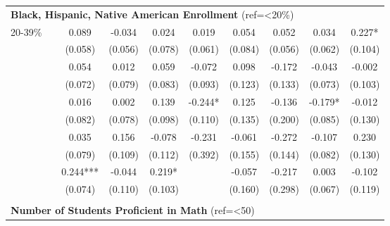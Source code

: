 \begin{tabular*}{\linewidth}{@{\extracolsep{\fill} } llcccccccc}
\multicolumn{10}{l}{\multirow{2}{1.8in}{\textbf{Black, Hispanic, Native American Enrollment} (ref=<20\%)}}\\%
&&&&&&&&&\\%
\multirow{2}{*}{\hspace{0.2cm}20{-}39\%}&&0.089&{-}0.034&0.024&0.019&0.054&0.052&0.034&0.227*\\%
&&(0.058)&(0.056)&(0.078)&(0.061)&(0.084)&(0.056)&(0.062)&(0.104)\\%
\arrayrulecolor{white}%
\hline%
\arrayrulecolor{white}%
\hline%
\arrayrulecolor{white}%
\hline%
\arrayrulecolor{white}%
\hline%
\arrayrulecolor{white}%
\hline%
\multirow{2}{*}{\hspace{0.2cm}40{-}59\%}&&0.054&0.012&0.059&{-}0.072&0.098&{-}0.172&{-}0.043&{-}0.002\\%
&&(0.072)&(0.079)&(0.083)&(0.093)&(0.123)&(0.133)&(0.073)&(0.103)\\%
\arrayrulecolor{white}%
\hline%
\arrayrulecolor{white}%
\hline%
\arrayrulecolor{white}%
\hline%
\arrayrulecolor{white}%
\hline%
\arrayrulecolor{white}%
\hline%
\multirow{2}{*}{\hspace{0.2cm}60{-}79\%}&&0.016&0.002&0.139&{-}0.244*&0.125&{-}0.136&{-}0.179*&{-}0.012\\%
&&(0.082)&(0.078)&(0.098)&(0.110)&(0.135)&(0.200)&(0.085)&(0.130)\\%
\arrayrulecolor{white}%
\hline%
\arrayrulecolor{white}%
\hline%
\arrayrulecolor{white}%
\hline%
\arrayrulecolor{white}%
\hline%
\arrayrulecolor{white}%
\hline%
\multirow{2}{*}{\hspace{0.2cm}80{-}89\%}&&0.035&0.156&{-}0.078&{-}0.231&{-}0.061&{-}0.272&{-}0.107&0.230\\%
&&(0.079)&(0.109)&(0.112)&(0.392)&(0.155)&(0.144)&(0.082)&(0.130)\\%
\arrayrulecolor{white}%
\hline%
\arrayrulecolor{white}%
\hline%
\arrayrulecolor{white}%
\hline%
\arrayrulecolor{white}%
\hline%
\arrayrulecolor{white}%
\hline%
\multirow{2}{*}{\hspace{0.2cm}90\%+}&&0.244***&{-}0.044&0.219*&&{-}0.057&{-}0.217&0.003&{-}0.102\\%
&&(0.074)&(0.110)&(0.103)&&(0.160)&(0.298)&(0.067)&(0.119)\\%
\arrayrulecolor{white}%
\hline%
\arrayrulecolor{white}%
\hline%
\arrayrulecolor{white}%
\hline%
\arrayrulecolor{white}%
\hline%
\arrayrulecolor{white}%
\hline%
&&&&&&&&&\\%
\multicolumn{10}{l}{\multirow{2}{1.8in}{\textbf{Number of Students Proficient in Math} (ref=<50)}}\\%

\end{tabular*}
